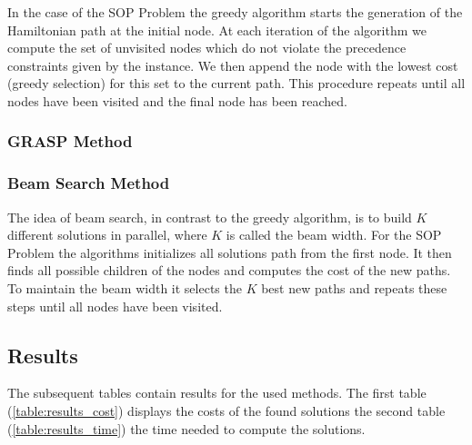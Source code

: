 \documentclass[]{article}
\begin{document}
   	In the case of the SOP Problem the greedy algorithm starts the generation of the Hamiltonian path at the initial node. At each iteration of the algorithm we compute the set of unvisited nodes which do not violate the precedence constraints given by the instance. We then append the node with the lowest cost (greedy selection) for this set to the current path. This procedure repeats until all nodes have been visited and the final node has been reached.

    \subsubsection{GRASP Method}


    \subsubsection{Beam Search Method}

    The idea of beam search, in contrast to the greedy algorithm, is to build $K$ different solutions in parallel, where $K$ is called the beam width. For the SOP Problem the algorithms initializes all solutions path from the first node. It then finds all possible children of the nodes and computes the cost of the new paths. To maintain the beam width it selects the $K$ best new paths and repeats these steps until all nodes have been visited. \cite{Beam:1} \cite{Beam:2} 


    \subsection{Results}
    \label{results}

    The subsequent tables contain results for the used methods. The first table (\ref{table:results_cost}) displays the costs of the found solutions the second table (\ref{table:results_time}) the time needed to compute the solutions. 
\end{document}
